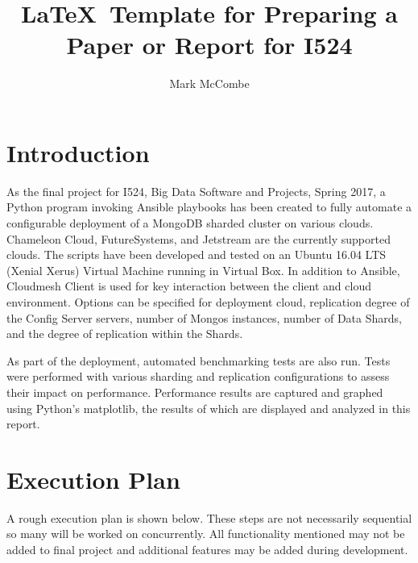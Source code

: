 \documentclass[9pt,twocolumn,twoside]{styles/osajnl}
\title{\LaTeX\ Template for Preparing a Paper or Report for I524}
\author[1,*]{Mark McCombe}
\affil[1]{School of Informatics and Computing, Bloomington, IN 47408, U.S.A.}
\affil[*]{Corresponding authors: laszewski@gmail.com}
\begin{document}
\maketitle

\section{Introduction}

As the final project for I524, Big Data Software and Projects, Spring 2017, a Python program invoking Ansible playbooks has been created to fully automate a configurable deployment of a MongoDB sharded cluster on various clouds.  Chameleon Cloud, FutureSystems, and Jetstream are the currently supported clouds.  The scripts have been developed and tested on an Ubuntu 16.04 LTS (Xenial Xerus) Virtual Machine running in Virtual Box.  In addition to Ansible, Cloudmesh Client is used for key interaction between the client and cloud environment.  Options can be specified  for deployment cloud, replication degree of the Config Server servers, number of Mongos instances, number of Data Shards, and the degree of replication within the Shards.

As part of the deployment, automated benchmarking tests are also run.  Tests were performed with various sharding and replication configurations to assess their impact on performance.  Performance results are captured and graphed using Python's matplotlib, the results of which are displayed and analyzed in this report.

\section{Execution Plan}

A rough execution plan is shown below.  These steps are not necessarily sequential so many will be worked on concurrently.  All functionality mentioned may not be added to final project and additional features may be added during development.
\end{document}
